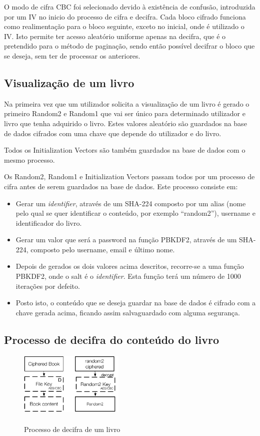 \documentclass[pdftex,12pt,a4paper]{report}
\begin{document}
O modo de cifra CBC foi selecionado devido à existência de confusão, introduzida por um IV no inicio do processo de cifra e decifra. Cada bloco cifrado funciona como realimentação para o bloco seguinte, exceto no inicial, onde é utilizado o IV. Isto permite ter acesso aleatório uniforme apenas na decifra, que é o pretendido para o método de paginação, sendo então possível decifrar o bloco que se deseja, sem ter de processar os anteriores. 

\subsection{Visualização de um livro}
Na primeira vez que um utilizador solicita a visualização de um livro é gerado o primeiro Random2 e Random1 que vai ser único para determinado utilizador e livro que tenha adquirido o livro. Estes valores aleatório são guardados na base de dados cifrados com uma chave que depende do utilizador e do livro.

Todos os Initialization Vectors são também guardados na base de dados com o mesmo processo.

Os Random2, Random1 e Initialization Vectors passam todos por um processo de cifra antes de serem guardados na base de dados. Este processo consiste em:

\begin{itemize}
\item Gerar um \textit{identifier}, através de um SHA-224 composto por um alias (nome pelo qual se quer identificar o conteúdo, por exemplo “random2”), username e identificador do livro.
\item Gerar um valor que será a password na função PBKDF2, através de um SHA-224, composto pelo username, email e último nome.
\item Depois de gerados os dois valores acima descritos, recorre-se a uma função PBKDF2, onde o salt é o \textit{identifier}. Esta função terá um número de 1000 iterações por defeito.
\item Posto isto, o conteúdo que se deseja guardar na base de dados é cifrado com a chave gerada acima, ficando assim salvaguardado com alguma segurança.
\end{itemize}

\subsection{Processo de decifra do conteúdo do livro}

\begin{figure}[!htb]
\center
 \includegraphics[width=50mm,scale=1]{book-decipher-process.pdf}
 \caption{\\ Processo de decifra de um livro}
 \label{fig:decifra_livro}
\end{figure}
\end{document}
